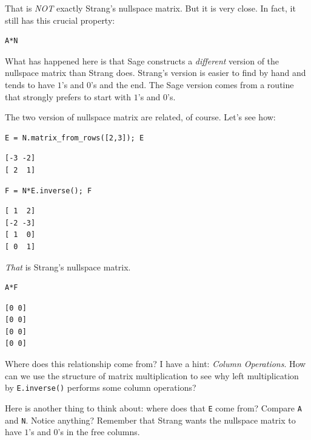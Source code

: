 \documentclass[10pt,]{book}
\theoremstyle{plain}
\numberwithin{equation}{section}
\begin{document}
      That is \emph{NOT} exactly Strang's nullspace matrix. But it is very close.
      In fact, it still has this crucial property:
\begin{lstlisting}[style=sageinput]
A*N
\end{lstlisting}
\par

      What has happened here is that Sage constructs a \emph{different} version
      of the nullspace matrix than Strang does. Strang's version is easier to
      find by hand and tends to have \(1\)'s and \(0\)'s and the end.
      The Sage version comes from a routine that strongly prefers to
      start with \(1\)'s and \(0\)'s.
\par

      The two version of nullspace matrix are related, of course. Let's see how:
\begin{lstlisting}[style=sageinput]
E = N.matrix_from_rows([2,3]); E
\end{lstlisting}
\begin{lstlisting}[style=sageoutput]
[-3 -2]
[ 2  1]
\end{lstlisting}
\begin{lstlisting}[style=sageinput]
F = N*E.inverse(); F
\end{lstlisting}
\begin{lstlisting}[style=sageoutput]
[ 1  2]
[-2 -3]
[ 1  0]
[ 0  1]
\end{lstlisting}
\par

      \emph{That} is Strang's nullspace matrix.
\begin{lstlisting}[style=sageinput]
A*F
\end{lstlisting}
\begin{lstlisting}[style=sageoutput]
[0 0]
[0 0]
[0 0]
[0 0]
\end{lstlisting}
\par

      Where does this relationship come from? I have a hint: \emph{Column Operations}.
      How can we use the structure of matrix multiplication to see why left multiplication
      by \verb?E.inverse()? performs some column operations?
\par

      Here is another thing to think about: where does that \verb?E? come from?
      Compare \verb?A? and \verb?N?. Notice anything? Remember that Strang wants
      the nullspace matrix to have \(1\)'s and \(0\)'s in the free columns.
\typeout{************************************************}
\typeout{************************************************}
\end{document}
